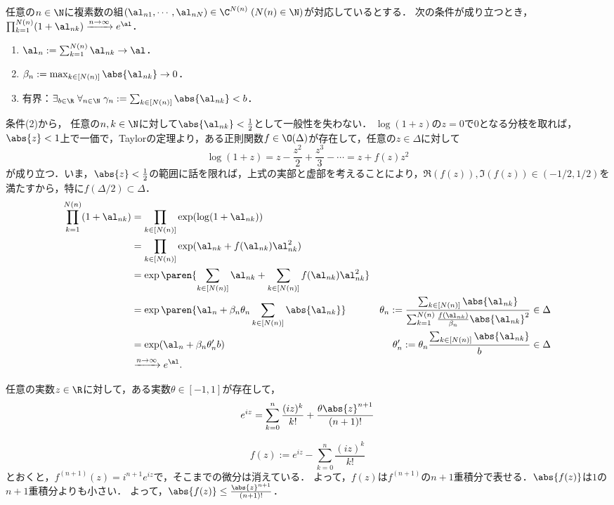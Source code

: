 \documentclass[uplatex,dvipdfmx]{jsreport}
\begin{document}
\begin{lemma}
    任意の$n\in\N$に複素数の組$(\al_{n1},\cdots,\al_{nN})\in\C^{N(n)}\;(N(n)\in\N)$が対応しているとする．
    次の条件が成り立つとき，$\prod_{k=1}^{N(n)}(1+\al_{nk})\xrightarrow{n\to\infty}e^\al$．
    \begin{enumerate}
        \item $\al_n:=\sum_{k=1}^{N(n)}\al_{nk}\to\al$．
        \item $\beta_n:=\max_{k\in[N(n)]}\abs{\al_{nk}}\to0$．
        \item 有界：$\exists_{b\in\R}\;\forall_{n\in\N}\;\gamma_n:=\sum_{k\in[N(n)]}\abs{\al_{nk}}<b$．
    \end{enumerate}
\end{lemma}
\begin{Proof}
    条件(2)から，
    任意の$n,k\in\N$に対して$\abs{\al_{nk}}<\frac{1}{2}$として一般性を失わない．
    $\log(1+z)$の$z=0$で$0$となる分枝を取れば，$\abs{z}<1$上で一価で，Taylorの定理より，ある正則関数$f\in\O(\Delta)$が存在して，任意の$z\in\Delta$に対して
    \[\log(1+z)=z-\frac{z^2}{2}+\frac{z^3}{3}-\cdots=z+f(z) z^2\]
    が成り立つ．いま，$\abs{z}<\frac{1}{2}$の範囲に話を限れば，上式の実部と虚部を考えることにより，$\Re(f(z)),\Im(f(z))\in(-1/2,1/2)$を満たすから，特に$f(\Delta/2)\subset\Delta$．
    \begin{align*}
        \prod_{k=1}^{N(n)}(1+\al_{nk})&=\prod_{k\in[N(n)]}\exp(\log(1+\al_{nk}))\\
        &=\prod_{k\in[N(n)]}\exp(\al_{nk}+f(\al_{nk})\al_{nk}^2)\\
        &=\exp\paren{\sum_{k\in[N(n)]}\al_{nk}+\sum_{k\in[N(n)]}f(\al_{nk})\al_{nk}^2}\\
        &=\exp\paren{\al_n+\beta_n\theta_n\sum_{k\in[N(n)]}\abs{\al_{nk}}}&\theta_n:=\frac{\sum_{k\in[N(n)]}\abs{\al_{nk}}}{\sum^{N(n)}_{k=1}\frac{f(\al_{nk})}{\beta_n}\abs{\al_{nk}}^2}\in\Delta\\
        &=\exp(\al_n+\beta_n\theta_n'b)&\theta_n':=\theta_n\frac{\sum_{k\in[N(n)]}\abs{\al_{nk}}}{b}\in\Delta\\
        &\xrightarrow{n\to\infty}e^\al.
    \end{align*}
\end{Proof}

\begin{lemma}
    任意の実数$z\in\R$に対して，ある実数$\theta\in[-1,1]$が存在して，
    \[e^{iz}=\sum^n_{k=0}\frac{(iz)^k}{k!}+\frac{\theta\abs{z}^{n+1}}{(n+1)!}\]
\end{lemma}
\begin{Proof}
    \[f(z):=e^{iz}-\sum^n_{k=0}\frac{(iz)^k}{k!}\]
    とおくと，$f^{(n+1)}(z)=i^{n+1}e^{iz}$で，そこまでの微分は消えている．
    よって，$f(z)$は$f^{(n+1)}$の$n+1$重積分で表せる．$\abs{f(z)}$は$1$の$n+1$重積分よりも小さい．
    よって，$\abs{f(z)}\le\frac{\abs{z}^{n+1}}{(n+1)!}$．
\end{Proof}
\end{document}
